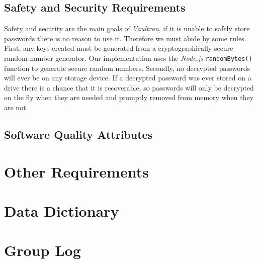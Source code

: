 \documentclass[11pt]{report}
\begin{document}
\section{Safety and Security Requirements}
Safety and security are the main goals of \textit{Vaultron}, if it is
unable to safely store passwords there is no reason to use it. Therefore
we must abide by some rules. First, any keys created must be generated
from a cryptographically secure random number generator. Our implementation
uses the \textit{Node.js} \texttt{randomBytes()} function to generate
secure random numbers. Secondly, no decrypted passwords will ever be
on any storage device. If a decrypted password was ever stored on a drive
there is a chance that it is recoverable, so passwords will only be 
decrypted on the fly when they are needed and promptly removed from
memory when they are not.


\section{Software Quality Attributes}




\chapter{Other Requirements}

\begin{appendices}
    \chapter{Data Dictionary}
    \chapter{Group Log}
\end{appendices}
\end{document}
